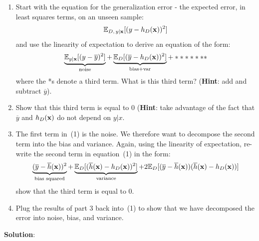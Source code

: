 \documentclass[12pt,letterpaper]{article}
\begin{document}
\begin{enumerate}
    \item Start with the equation for the generalization error - the expected error, in least squares terms, on an unseen sample:
    \begin{align}
        \mathbb{E}_{D, \, y|\mathbf{x}}[(y-h_D(\mathbf{x}))^2]\notag
    \end{align}
    and use the linearity of expectation to derive an equation of the form:
    \begin{align}
        \underbrace{\mathbb{E}_{y|\mathbf{x}}[(y-\overline{y})^2]}_\text{noise}
+\underbrace{\mathbb{E}_D[(\overline{y}-h_D(\mathbf{x}))^2]}_\text{bias+var}
+ *******
    \end{align}{}
    where the *s denote a third term. What is this third term? (\textbf{Hint}: add and subtract $\overline{y}$).
    \item
    Show that this third term is equal to 0 (\textbf{Hint}: take advantage of the fact that $\overline{y}$ and $h_D(\mathbf{x})$ do not depend on $y|x$.
    \item
    The first term in~(1) is the noise. We therefore want to decompose the second term into the bias and variance. Again, using the linearity of expectation, re-write the second term in equation~(1) in the form:
    \begin{align}
        \underbrace{(\overline{y}-\overline{h}(\mathbf{x}))^2}_\text{bias squared}+\underbrace{\mathbb{E}_D[(\overline{h}(\mathbf{x})-h_D(\mathbf{x}))^2]}_\text{variance}
+2\mathbb{E}_D[(\overline{y}-\overline{h}(\mathbf{x}))(\overline{h}(\mathbf{x})-h_D(\mathbf{x}))]
    \end{align}
    show that the third term is equal to 0.
    \item
    Plug the results of part 3 back into~(1) to show that we have decomposed the error into noise, bias, and variance.
\end{enumerate}
\noindent \textbf{Solution}:
\end{document}
